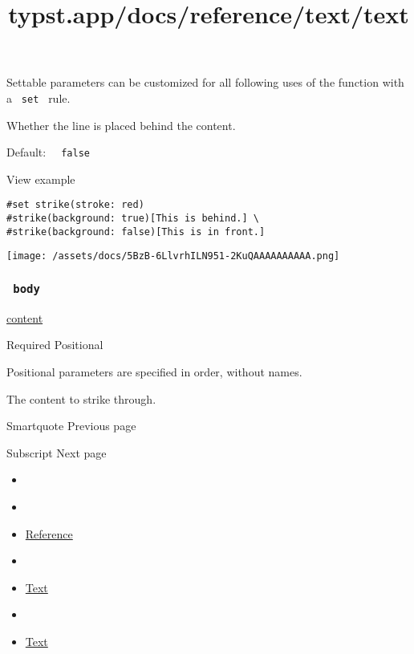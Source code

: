 \label{parameters-background-settable-tooltip}
Settable parameters can be customized for all following uses of the
function with a \texttt{\ set\ } rule.

Whether the line is placed behind the content.

Default: \texttt{\ }{\texttt{\ false\ }}\texttt{\ }


View example

\begin{verbatim}
#set strike(stroke: red)
#strike(background: true)[This is behind.] \
#strike(background: false)[This is in front.]
\end{verbatim}

\texttt{[image: /assets/docs/5BzB-6LlvrhILN951-2KuQAAAAAAAAAA.png]}

\subsubsection{\texorpdfstring{\texttt{\ body\ }}{ body }}\label{parameters-body}

\href{/docs/reference/foundations/content/}{content}

{Required} {{ Positional }}

\label{parameters-body-positional-tooltip}
Positional parameters are specified in order, without names.

The content to strike through.

\href{/docs/reference/text/smartquote/}{\pandocbounded{}}

{ Smartquote } { Previous page }

\href{/docs/reference/text/sub/}{\pandocbounded{}}

{ Subscript } { Next page }


\title{typst.app/docs/reference/text/text}

\begin{itemize}
\tightlist
\item
  \href{/docs}{}
\item
  
\item
  \href{/docs/reference/}{Reference}
\item
  
\item
  \href{/docs/reference/text/}{Text}
\item
  
\item
  \href{/docs/reference/text/text/}{Text}
\end{itemize}

